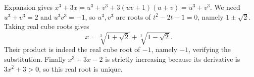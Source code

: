 Expansion gives $x^3+3x=u^3+v^3+3(uv+1)(u+v)=u^3+v^3$. We need $u^3+v^3=2$ and $u^3v^3=-1$, so $u^3,v^3$ are roots of $t^2-2t-1=0$, namely $1\pm\sqrt2$. Taking real cube roots gives
\[\boxed{x=\sqrt[3]{1+\sqrt2}+\sqrt[3]{1-\sqrt2}}.\]
Their product is indeed the real cube root of $-1$, namely $-1$, verifying the substitution. Finally $x^3+3x-2$ is strictly increasing because its derivative is $3x^2+3>0$, so this real root is unique.

